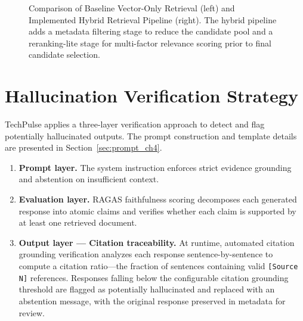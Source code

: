 \documentclass[12pt,a4paper]{report}
\begin{document}
\begin{figure}[H]
\caption{Comparison of Baseline Vector-Only Retrieval (left) and Implemented Hybrid Retrieval Pipeline (right). The hybrid pipeline adds a metadata filtering stage to reduce the candidate pool and a reranking-lite stage for multi-factor relevance scoring prior to final candidate selection.}
\label{fig:retrieval_comparison}
\end{figure}

\section{Hallucination Verification Strategy}
\label{sec:prompt}

TechPulse applies a three-layer verification approach to detect and flag potentially hallucinated outputs. The prompt construction and template details are presented in Section~\ref{sec:prompt_ch4}.

\begin{enumerate}[leftmargin=0.5in]
  \item \textbf{Prompt layer.} The system instruction enforces strict evidence grounding and abstention on insufficient context.

  \item \textbf{Evaluation layer.} RAGAS faithfulness scoring decomposes each generated response into atomic claims and verifies whether each claim is supported by at least one retrieved document.

  \item \textbf{Output layer --- Citation traceability.} At runtime, automated citation grounding verification analyzes each response sentence-by-sentence to compute a citation ratio---the fraction of sentences containing valid \texttt{[Source N]} references. Responses falling below the configurable citation grounding threshold are flagged as potentially hallucinated and replaced with an abstention message, with the original response preserved in metadata for review.
\end{enumerate}
\end{document}
